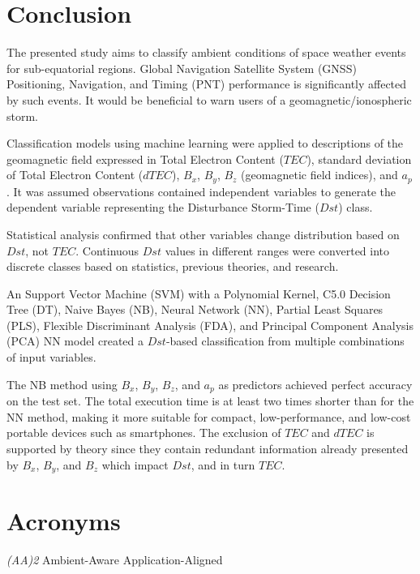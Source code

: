 \let\LaTeXcline\cline\documentclass[sn-mathphys-num]{sn-jnl}\let\cline\LaTeXcline
\begin{document}
\section{Conclusion}
\label{sec:Conclusion}

The presented study aims to classify ambient conditions of space weather events for sub-equatorial regions. Global Navigation Satellite System (GNSS) Positioning, Navigation, and Timing (PNT) performance is significantly affected by such events. It would be beneficial to warn users of a geomagnetic/ionospheric storm.

Classification models using machine learning were applied to descriptions of the geomagnetic field expressed in Total Electron Content ($TEC$), standard deviation of Total Electron Content ($dTEC$), $B_{x}$, $B_{y}$, $B_{z}$ (geomagnetic field indices), and $a_{p}$. It was assumed observations contained independent variables to generate the dependent variable representing the Disturbance Storm-Time ($Dst$) class. 

Statistical analysis confirmed that other variables change distribution based on $Dst$, not $TEC$. Continuous $Dst$ values in different ranges were converted into discrete classes based on statistics, previous theories, and research. 

An Support Vector Machine (SVM) with a Polynomial Kernel, C5.0 Decision Tree (DT), Naive Bayes (NB), Neural Network (NN), Partial Least Squares (PLS), Flexible Discriminant Analysis (FDA), and Principal Component Analysis (PCA) NN model created a $Dst$-based classification from multiple combinations of input variables.

The NB method using $B_{x}$, $B_{y}$, $B_{z}$, and $a_{p}$ as predictors achieved perfect accuracy on the test set. The total execution time is at least two times shorter than for the NN method, making it more suitable for compact, low-performance, and low-cost portable devices such as smartphones. The exclusion of $TEC$ and $dTEC$ is supported by theory since they contain redundant information already presented by $B_{x}$, $B_{y}$, and $B_{z}$ which impact $Dst$, and in turn  $TEC$.

\clearpage

\section{Acronyms}
\label{sec:Acronyms}

\textit{(AA)2} Ambient-Aware Application-Aligned
\end{document}

